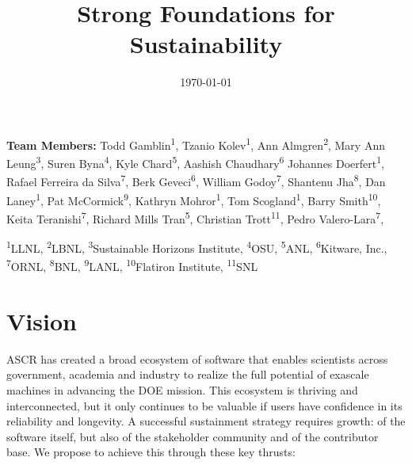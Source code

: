 \documentclass[11pt]{article}
\title{\vspace{-3em}\sf\huge\color{secblue}%
Strong Foundations for Sustainability}
\date{\vspace{-4em}\footnotesize\today\vspace{-3em}}
\begin{document}
\setcounter{page}{1}

\maketitle

{\footnotesize
{\bf Team Members:}
  Todd Gamblin\textsuperscript{1},
  Tzanio Kolev\textsuperscript{1},
  Ann Almgren\textsuperscript{2},
  Mary Ann Leung\textsuperscript{3},
  Suren Byna\textsuperscript{4},
  Kyle Chard\textsuperscript{5},
  Aashish Chaudhary\textsuperscript{6}
  Johannes Doerfert\textsuperscript{1},
  Rafael Ferreira da Silva\textsuperscript{7},
  Berk Geveci\textsuperscript{6},
  William Godoy\textsuperscript{7},
  Shantenu Jha\textsuperscript{8},
  Dan Laney\textsuperscript{1},
  Pat McCormick\textsuperscript{9},
  Kathryn Mohror\textsuperscript{1},
  Tom Scogland\textsuperscript{1},
  Barry Smith\textsuperscript{10},
  Keita Teranishi\textsuperscript{7},
  Richard Mills Tran\textsuperscript{5},
  Christian Trott\textsuperscript{11},
  Pedro Valero-Lara\textsuperscript{7},

  \textsuperscript{1}LLNL,
  \textsuperscript{2}LBNL,
  \textsuperscript{3}Sustainable Horizons Institute,
  \textsuperscript{4}OSU,
  \textsuperscript{5}ANL,
  \textsuperscript{6}Kitware, Inc.,
  \textsuperscript{7}ORNL,
  \textsuperscript{8}BNL,
  \textsuperscript{9}LANL,
  \textsuperscript{10}Flatiron Institute,
  \textsuperscript{11}SNL

}

\section{Vision}

ASCR has created a broad ecosystem of software that
enables scientists across government, academia and industry to realize the full
potential of exascale machines in advancing the DOE mission.
This ecosystem is thriving and interconnected,
but it only continues to be
valuable if users have confidence in its reliability and longevity.
A successful sustainment strategy requires growth: of the software itself,
but also of the stakeholder community and of the contributor base.
We propose to achieve this through these key thrusts:
\end{document}

